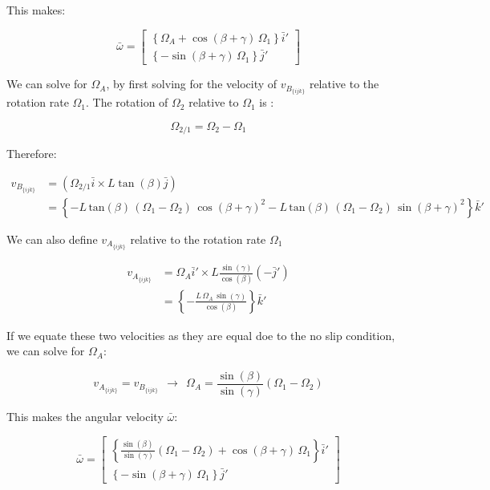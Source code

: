 \documentclass[12pt, letterpaper]{../assignment}
\begin{document}
This makes:

$$ \bar{\omega} = \left[\begin{array}{r} \left\{\Omega _{A}+\cos\left(\beta +\gamma \right)\,\Omega _{1}\right\} \bar{i}'\\ \left\{-\sin\left(\beta +\gamma \right)\,\Omega _{1}\right\} \bar{j}' \end{array}\right] $$

We can solve for $\Omega_A$, by first solving for the velocity of $v_{B_{\{ijk\}}}$ relative to the rotation rate $\Omega_1$.
The rotation of $\Omega_2$ relative to $\Omega_1$ is :

$$ \Omega_{2/1} = \Omega_2 - \Omega_1 $$

Therefore:

\begin{equation*}
\begin{aligned}
v_{B_{\{ijk\}}} &= \left(\Omega_{2/1} \bar{i} \times L\tan(\beta) \bar{j}\right)\\
    &= \left\{-L\,\mathrm{tan}\left(\beta \right)\,\left(\Omega _{1}-\Omega _{2}\right)\,{\cos\left(\beta +\gamma \right)}^2-L\,\mathrm{tan}\left(\beta \right)\,\left(\Omega _{1}-\Omega _{2}\right)\,{\sin\left(\beta +\gamma \right)}^2\right\} \bar{k}' 
\end{aligned}
\end{equation*}

We can also define $v_{A_{\{ijk\}}}$ relative to the rotation rate $\Omega_1$

\begin{equation*}
\begin{aligned}
    v_{A_{\{ijk\}}} &= \Omega_A \bar{i}' \times L \frac{\sin(\gamma)}{\cos(\beta)}(-\bar{j}' )\\
        &= \left\{-\frac{L\,\Omega _{A}\,\sin\left(\gamma \right)}{\cos\left(\beta \right)} \right\} \bar{k}'
\end{aligned}
\end{equation*}

If we equate these two velocities as they are equal doe to the no slip condition, we can solve for $\Omega_A$:

$$ v_{A_{\{ijk\}}} = v_{B_{\{ijk\}}} \ \ \rightarrow  \ \
\Omega_A = \frac{\sin\left(\beta \right)}{\sin\left(\gamma \right)} \left(\Omega _{1}-\Omega _{2}\right)  $$

This makes the angular velocity $\bar{\omega}$:

\begin{answer}
$$ \bar{\omega} = \left[\begin{array}{r} \left\{ \frac{\sin\left(\beta \right)\,}{\sin\left(\gamma \right)}\left(\Omega _{1}-\Omega _{2}\right) + \cos\left(\beta +\gamma \right)\,\Omega _{1} \right\} \bar{i}'\\
    \left\{-\sin\left(\beta +\gamma \right)\,\Omega _{1} \right\} \bar{j}' \end{array}\right] $$
\end{answer}
\end{document}
